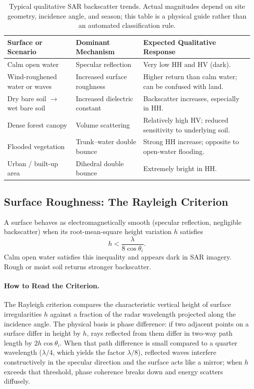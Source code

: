 \documentclass[11pt,a4paper]{article}
\begin{document}
\begin{table}[htbp]
\centering\small
\begin{tabularx}{\linewidth}{p{.26\linewidth}p{.3\linewidth}X}
\toprule
\textbf{Surface or Scenario} & \textbf{Dominant Mechanism} & \textbf{Expected Qualitative Response}\\\midrule
Calm open water & Specular reflection & Very low HH and HV (dark).\\
Wind-roughened water or waves & Increased surface roughness & Higher return than calm water; can be confused with land.\\
Dry bare soil $\to$ wet bare soil & Increased dielectric constant & Backscatter increases, especially in HH.\\
Dense forest canopy & Volume scattering & Relatively high HV; reduced sensitivity to underlying soil.\\
Flooded vegetation & Trunk--water double bounce & Strong HH increase; opposite to open-water flooding.\\
Urban / built-up area & Dihedral double bounce & Extremely bright in HH.\\\bottomrule
\end{tabularx}
\caption{Typical qualitative SAR backscatter trends. Actual magnitudes depend on site geometry, incidence angle, and season; this table is a physical guide rather than an automated classification rule.}
\label{tab:escenarios}
\end{table}

\subsection{Surface Roughness: The Rayleigh Criterion}
\label{sec:rayleigh}
A surface behaves as electromagnetically smooth (specular reflection, negligible backscatter) when its root-mean-square height variation $h$ satisfies
\begin{equation}
  h < \frac{\lambda}{8\cos\theta_i}.
\end{equation}
Calm open water satisfies this inequality and appears dark in SAR imagery. Rough or moist soil returns stronger backscatter.

\paragraph{How to Read the Criterion.} The Rayleigh criterion compares the characteristic vertical height of surface irregularities $h$ against a fraction of the radar wavelength projected along the incidence angle. The physical basis is phase difference: if two adjacent points on a surface differ in height by $h$, rays reflected from them differ in two-way path length by $2h\cos\theta_i$. When that path difference is small compared to a quarter wavelength ($\lambda/4$, which yields the factor $\lambda/8$), reflected waves interfere constructively in the specular direction and the surface acts like a mirror; when $h$ exceeds that threshold, phase coherence breaks down and energy scatters diffusely.
\end{document}
